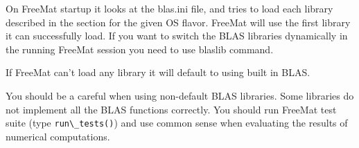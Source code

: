 On FreeMat startup it looks at the blas.ini file, and tries to load each
library described in the section for the given OS flavor. FreeMat will
use the first library it can successfully load. If you want to switch
the BLAS libraries dynamically in the running FreeMat session you need
to use blaslib command.

If FreeMat can't load any library it will default to using built in BLAS.

You should be a careful when using non-default BLAS
libraries. Some libraries do not implement all the BLAS functions
correctly. You should run FreeMat test suite (type \verb|run\_tests()|) and use
common sense when evaluating the results of numerical computations. 
